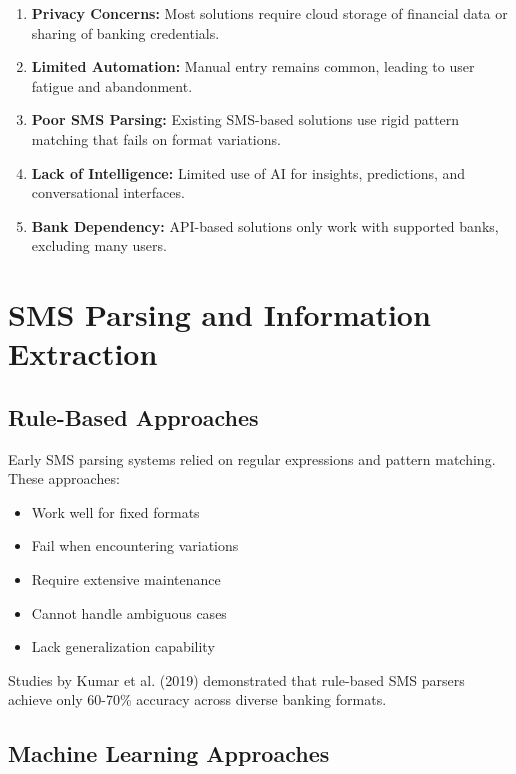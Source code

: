 \documentclass[11pt,a4paper]{report}
\begin{document}
\begin{enumerate}
    \item \textbf{Privacy Concerns:} Most solutions require cloud storage of financial data or sharing of banking credentials.
    
    \item \textbf{Limited Automation:} Manual entry remains common, leading to user fatigue and abandonment.
    
    \item \textbf{Poor SMS Parsing:} Existing SMS-based solutions use rigid pattern matching that fails on format variations.
    
    \item \textbf{Lack of Intelligence:} Limited use of AI for insights, predictions, and conversational interfaces.
    
    \item \textbf{Bank Dependency:} API-based solutions only work with supported banks, excluding many users.
\end{enumerate}

\section{SMS Parsing and Information Extraction}

\subsection{Rule-Based Approaches}

Early SMS parsing systems relied on regular expressions and pattern matching. These approaches:

\begin{itemize}
    \item Work well for fixed formats
    \item Fail when encountering variations
    \item Require extensive maintenance
    \item Cannot handle ambiguous cases
    \item Lack generalization capability
\end{itemize}

Studies by Kumar et al. (2019) demonstrated that rule-based SMS parsers achieve only 60-70\% accuracy across diverse banking formats.

\subsection{Machine Learning Approaches}
\end{document}
